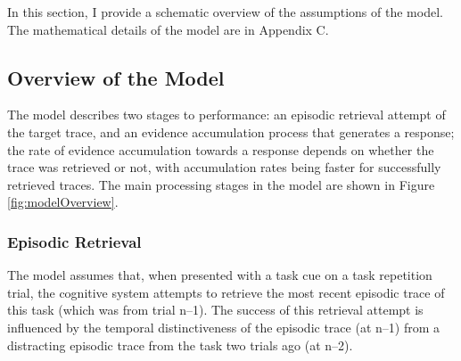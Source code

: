\documentclass[a4paper, man, natbib]{apa6}
\begin{document}
In this section, I provide a schematic overview of the assumptions of the model. The mathematical details of the model are in Appendix C.

\subsection{Overview of the Model}
The model describes two stages to performance: an episodic retrieval attempt of the target trace, and an evidence accumulation process that generates a response; the rate of evidence accumulation towards a response depends on whether the trace was retrieved or not, with accumulation rates being faster for successfully retrieved traces. The main processing stages in the model are shown in Figure \ref{fig:modelOverview}. 

\subsubsection{Episodic Retrieval}
 The model assumes that, when presented with a task cue on a task repetition trial, the cognitive system attempts to retrieve the most recent episodic trace of this task (which was from trial n--1). The success of this retrieval attempt is influenced by the temporal distinctiveness of the episodic trace (at n--1) from a distracting episodic trace from the task two trials ago (at n--2).  
\end{document}
